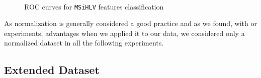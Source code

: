 \begin{figure}[!htb]
  \centering
    \\
    \hspace{1mm}
    \caption{ROC curves for \texttt{MSiHLV} features classification}
    \label{ch6:fig2}
\end{figure}


As normalization is generally considered a good practice and as we found, with or experiments, advantages when we applied it to our data, we considered 
only a normalized dataset in all the following experiments.

\vspace{0.5cm}


\subsection{Extended Dataset}


